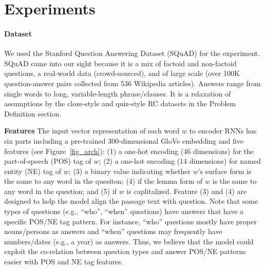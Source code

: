 \documentclass[letterpaper]{article}
\begin{document}
\section{Experiments}

\paragraph{Dataset}
We used the Stanford Question Answering Dataset (SQuAD) \cite{rajpurkar2016squad} for the experiment. SQuAD came into our sight because it is a mix of factoid and non-factoid questions, a real-world data (crowd-sourced), and of large scale (over 100K question-answer pairs collected from 536 Wikipedia articles). Answers range from single words to long, variable-length phrase/clauses. It is a relaxation of assumptions by the cloze-style and quiz-style RC datasets in the Problem Definition section.


\noindent\textbf{{Features}}
The input vector representation of each word $w$ to encoder RNNs has six parts including a pre-trained 300-dimensional GloVe embedding \cite{pennington2014glove} and five features (see Figure~\ref{fig_arch}): (1) a one-hot encoding (46 dimensions) for the part-of-speech (POS) tag of $w$; (2) a one-hot encoding (14 dimensions) for named entity (NE) tag of $w$; (3) a binary value indicating whether $w$'s surface form is the same to any word in the quesiton; (4) if the lemma form of $w$ is the same to any word in the question; and (5) if $w$ is caplitalized. Feature (3) and (4) are designed to help the model align the passage text with question. Note that some types of questions (e.g., ``who'', ``when'' questions) have answers that have a specific POS/NE tag pattern. For instance, ``who'' questions mostly have proper nouns/persons as answers and ``when'' questions may frequently have numbers/dates (e.g., a year) as answers. Thus, we believe that the model could exploit the co-relation between question types and answer POS/NE patterns easier with POS and NE tag features. 
\end{document}
